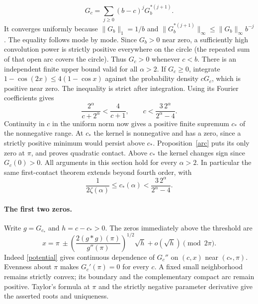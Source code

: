 \documentclass[11pt]{article}
\theoremstyle{plain}\newtheorem{theorem}{Theorem}[section]\newtheorem{lemma}[theorem]{Lemma}\newtheorem{corollary}[theorem]{Corollary}\newtheorem{proposition}[theorem]{Proposition}
\numberwithin{equation}{section}
\begin{document}
\[
 G_c=\sum_{j\ge0}(b-c)^j G_b^{*(j+1)} .
\]
It converges uniformly because $\|G_b\|_1=1/b$ and $\|G_b^{*(j+1)}\|_\infty\le\|G_b\|_\infty b^{-j}$. The equality follows mode by mode. Since $G_b>0$ near zero, a sufficiently high convolution power is strictly positive everywhere on the circle (the repeated sum of that open arc covers the circle). Thus $G_c>0$ whenever $c<b$. There is an independent finite upper bound valid for all $\alpha>2$. If $G_c\ge0$, integrate $1-\cos(2x)\le4(1-\cos x)$ against the probability density $cG_c$, which is positive near zero. The inequality is strict after integration. Using its Fourier coefficients gives
\[
       \frac{2^\alpha}{c+2^\alpha}<\frac4{c+1},
       \qquad c<\frac{3\,2^\alpha}{2^\alpha-4}.
\] Continuity in $c$ in the uniform norm now gives a positive finite supremum $c_*$ of the nonnegative range. At $c_*$ the kernel is nonnegative and has a zero, since a strictly positive minimum would persist above $c_*$. Proposition~\ref{arc} puts its only zero at $\pi$, and proves quadratic contact. Above $c_*$ the kernel changes sign since $G_c(0)>0$. All arguments in this section hold for every $\alpha>2$. In particular the same first-contact theorem extends beyond fourth order, with
\[
       \frac{1}{2\zeta(\alpha)}\le c_*(\alpha)
           <\frac{3\,2^\alpha}{2^\alpha-4}.
\]
\paragraph{The first two zeros.} Write $g=G_{c_*}$ and $h=c-c_*>0$. The zeros immediately above the threshold are
\[
 x=\pi\ \pm\left(\frac{2(g*g)(\pi)}{g''(\pi)}\right)^{1/2}
             \sqrt h+o(\sqrt h) \pmod{2\pi}.
\]
Indeed \eqref{potential} gives continuous dependence of $G_c''$ on $(c,x)$ near $(c_*,\pi)$. Evenness about $\pi$ makes $G_c'(\pi)=0$ for every $c$. A fixed small neighborhood remains strictly convex; its boundary and the complementary compact arc remain positive. Taylor's formula at $\pi$ and the strictly negative parameter derivative give the asserted roots and uniqueness.
\end{document}
